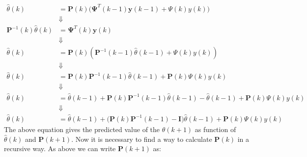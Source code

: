 \documentclass[11pt,a4paper,oneside]{book}
\numberwithin{equation}{section}
\theoremstyle{it}
\theoremstyle{definition}
\begin{document}
\begin{equation}
	\begin{aligned}
		\hat{\theta}(k) &= 
		\mathbf{P}(k)\Big(\mathbf{\Psi}^T(k-1)\mathbf{y}(k-1)+\Psi(k)y(k)\Big) 
		\\[6pt]
		& \Downarrow \\[6pt]
		\mathbf{P}^{-1}(k)\hat{\theta}(k) &= \mathbf{\Psi}^T(k)\mathbf{y}(k) 
		\\[6pt]
		& \Downarrow \\[6pt]
		\hat{\theta}(k) &= 
		\mathbf{P}(k)\left(\mathbf{P}^{-1}(k-1)\hat{\theta}(k-1)+\Psi(k)y(k)\right)
		 \\[6pt]
		& \Downarrow \\[6pt]
		\hat{\theta}(k) &= 
		\mathbf{P}(k)\mathbf{P}^{-1}(k-1)\hat{\theta}(k-1)+\mathbf{P}(k)\Psi(k)y(k)
		 \\[6pt]
		& \Downarrow \\[6pt]
		\hat{\theta}(k) &= 
		\hat{\theta}(k-1)+\mathbf{P}(k)\mathbf{P}^{-1}(k-1)\hat{\theta}(k-1)-\hat{\theta}(k-1)+\mathbf{P}(k)\Psi(k)y(k)
		 \\[6pt]
		& \Downarrow \\[6pt]
		\hat{\theta}(k) &= 
		\hat{\theta}(k-1)+\Big(\mathbf{P}(k)\mathbf{P}^{-1}(k-1)-\mathbf{I}\Big)\hat{\theta}(k-1)+\mathbf{P}(k)\Psi(k)y(k)
	\end{aligned}
\end{equation}
The above equation gives the predicted value of the $\hat{\theta}(k+1)$ as 
function of $\hat{\theta}(k)$ and $\mathbf{P}(k+1)$.
Now it is necessary to find a way to calculate $\mathbf{P}(k)$ in a recursive 
way.
As above we can write $\mathbf{P}(k+1)$ as: 
\end{document}

